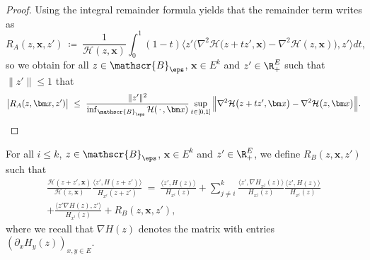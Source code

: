 \begin{refsegment}
\begin{proof}
Using the integral remainder formula yields that the remainder term writes as
\begin{equation*}
R_A(z, \bm x, z')\ \coloneqq\ \frac{1}{\mathcal{H}( z,\bm x)}\int_0^1 (1-t)\big\langle z' \big(\nabla^2\mathcal H\big(z+tz', \bm x)-\nabla^2\mathcal H(z, \bm x)\big), z'\big\rangle dt,
\end{equation*}
so we obtain for all $z\in\mathscr{B}_{\eps}$, $\bm x\in E^k$ and $z'\in \R_+^E$ such that $\lVert z'\rVert \leq 1$ that 
\[
\big|R_A(z,\bm x, z')\big|\  \leq\ \frac{\lVert z' \rVert^2}{\inf_{\mathscr{B}_\eps}\mathcal{H}(\,\cdot\,,\bm x)} \sup_{t\in [0,1]}\Big\lVert\nabla^2\mathcal H\big(z+tz', \bm x\big)-\nabla^2\mathcal H\big(z, \bm x\big)\Big\rVert.
\]

\end{proof}

\begin{lem}\label{lem:taylor_dvp_B}
For all $i\leq k$, $z\in \mathscr{B}_\eps$, $\bm x\in E^k$ and $z'\in\R_+^E$, we define $R_B(z, \bm x, z')$ such that
\begin{multline*}
\frac{\mathcal{H}(z+ z', \bm x)}{\mathcal{H}(z, \bm x)}\frac{\big\langle z' , H(z+ z')\big\rangle}{H_{x^i}(z+ z')}
\  =\  
\frac{\langle z' , H(z)\rangle}{H_{x^i}(z)} + \sum_{j\neq i}^k \frac{\langle  z', \nabla H_{x^j}(z)\rangle}{ H_{x^j}(z)}\frac{\langle z',H(z)\rangle}{H_{x^i}(z)}\\
 + \frac{\langle z'\nabla H(z), z'\rangle}{H_{x^i}(z)} +R_B(z, \bm x, z'),
\end{multline*}
where we recall that $\nabla H(z)$ denotes the matrix with entries $(\partial_x H_y(z))_{x,y\in E}$.


\end{lem}
\end{refsegment}
